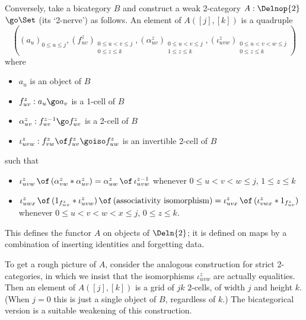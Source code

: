 Conversely, take a bicategory $B$ and construct a weak 2-category $A:
\Delnop{2}$\linebreak$\go \Set$ (its `2-nerve') as follows.  An element of
$A([j],[k])$ is a quadruple
%
\renewcommand{\arraystretch}{0.8}	%
%
\[
((a_u)_{0\leq u\leq j},
(f_{uv}^z)_{\begin{array}{cc} \scriptstyle
	0\leq u < v\leq j\\ \scriptstyle
	0\leq z \leq k
	\end{array}},
(\alpha_{uv}^z)_{\begin{array}{cc} \scriptstyle
	0\leq u < v \leq j\\ \scriptstyle
	1\leq z \leq k
	\end{array}},
(\iota_{uvw}^z)_{\begin{array}{cc} \scriptstyle
	0\leq u < v < w \leq j\\ \scriptstyle
	0 \leq z \leq k
	\end{array}})
\]
%
\renewcommand{\arraystretch}{1}		
%
where
%
\begin{itemize}
\item $a_u$ is an object of $B$
\item $f_{uv}^z: a_u \go a_v$ is a 1-cell of $B$
\item $\alpha_{uv}^z: f_{uv}^{z-1} \go f_{uv}^z$ is a
2-cell of $B$
\item $\iota_{uvw}^z: f_{vw}^z \of f_{uv}^z 
\goiso f_{uw}^z$ is an invertible 2-cell of $B$ 
\end{itemize}
such that
\begin{itemize}
\item $\iota_{uvw}^z \,\of\, (\alpha_{vw}^z * \alpha_{uv}^z) =
\alpha_{uw}^z \,\of\, \iota_{uvw}^{z-1}$ 
whenever $0\leq u < v < w \leq j$, $1\leq z \leq k$
\item $\iota_{uwx}^z \,\of\, (1_{f_{wx}^z} * \iota_{uvw}^z)
\,\of\, (\textrm{associativity isomorphism})
=
\iota_{uvx}^z \,\of\, (\iota_{vwx}^z * 1_{f_{uv}^z})$
whenever $0\leq u < v < w < x \leq j$, $0\leq z \leq k$.
\end{itemize}
%
This defines the functor $A$ on objects of $\Deln{2}$; it is defined on maps
by a combination of inserting identities and forgetting data.

To get a rough picture of $A$, consider the analogous construction for
strict 2-categories, in which we insist that the isomorphisms
$\iota_{uvw}^z$ are actually equalities.  Then an element of
$A([j],[k])$ is a grid of $jk$ $2$-cells, of width $j$ and height $k$.  (When
$j=0$ this is just a single object of $B$, regardless of $k$.)  The
bicategorical version is a suitable weakening of this construction.

